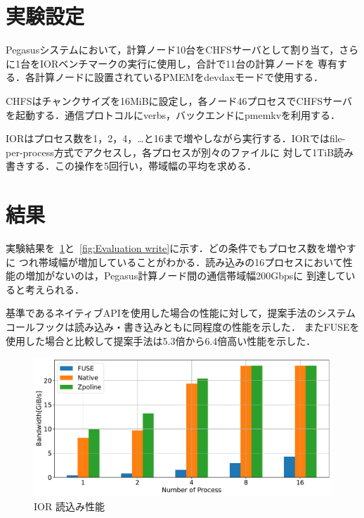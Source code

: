 \documentclass[a4paper，11pt]{jreport}
\begin{document}
\section{実験設定}
Pegasusシステムにおいて，計算ノード10台をCHFSサーバとして割り当て，さらに1台をIORベンチマークの実行に使用し，合計で11台の計算ノードを
専有する．各計算ノードに設置されているPMEMをdevdaxモードで使用する．

CHFSはチャンクサイズを16MiBに設定し，各ノード46プロセスでCHFSサーバを起動する．通信プロトコルにverbs，バックエンドにpmemkvを利用する．

IORはプロセス数を1，2，4，…と16まで増やしながら実行する．IORではfile-per-process方式でアクセスし，各プロセスが別々のファイルに
対して1TiB読み書きする．この操作を5回行い，帯域幅の平均を求める．
\section{結果}

実験結果を\figurename~\ref{fig:Evaluation read}と\figurename~\ref{fig:Evaluation write}に示す．どの条件でもプロセス数を増やすに
つれ帯域幅が増加していることがわかる．読み込みの16プロセスにおいて性能の増加がないのは，Pegasus計算ノード間の通信帯域幅200Gbpsに
到達していると考えられる．

基準であるネイティブAPIを使用した場合の性能に対して，提案手法のシステムコールフックは読み込み・書き込みともに同程度の性能を示した．
またFUSEを使用した場合と比較して提案手法は5.3倍から6.4倍高い性能を示した．

\newpage

\begin{figure}[h]
	\begin{minipage}[b]{1\columnwidth}
		\centering
		\includegraphics[width=0.9\linewidth]{./figure/ior_benchmark_read.pdf}
		\caption{IOR 読込み性能}
		\label{fig:Evaluation read}
	\end{minipage}
\end{figure}
\end{document}

